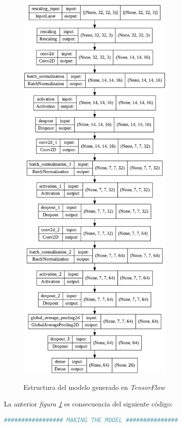 \begin{appendices}
\begin{figure}[]
    \centering
    \includegraphics[width=0.69\textwidth]{capturas/estructuraRNTF.png}\\[-0,2cm]
    \caption{Estructura del modelo generado en \textit{TensorFlow}\label{estRN}}
\end{figure}

La anterior \textit{figura \ref{estRN}} es consecuencia del siguiente código:
\begin{lstlisting}[language=python, title=Fragmento de \href{https://github.com/AntonioPriego/SmartPen/blob/main/Train/Train.ipynb}{\textit{Train.ipynb}}]
################# MAKING THE MODEL ###############


\end{lstlisting}
\end{appendices}
